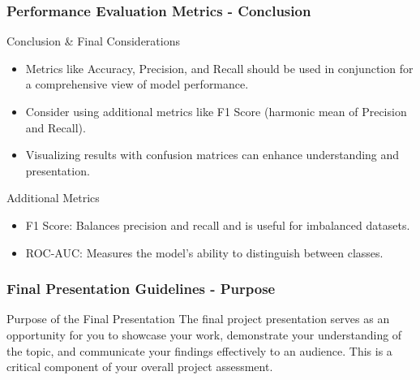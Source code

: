 \documentclass[aspectratio=169]{beamer}
\begin{document}
\begin{frame}[fragile]
    \frametitle{Performance Evaluation Metrics - Conclusion}
    \begin{block}{Conclusion & Final Considerations}
        \begin{itemize}
            \item Metrics like Accuracy, Precision, and Recall should be used in conjunction for a comprehensive view of model performance.
            \item Consider using additional metrics like F1 Score (harmonic mean of Precision and Recall).
            \item Visualizing results with confusion matrices can enhance understanding and presentation.
        \end{itemize}
    \end{block}  

    \begin{block}{Additional Metrics}
        \begin{itemize}
            \item F1 Score: Balances precision and recall and is useful for imbalanced datasets.
            \item ROC-AUC: Measures the model's ability to distinguish between classes.
        \end{itemize}
    \end{block}  
\end{frame}

\begin{frame}[fragile]
    \frametitle{Final Presentation Guidelines - Purpose}
    \begin{block}{Purpose of the Final Presentation}
        The final project presentation serves as an opportunity for you to showcase your work, demonstrate your understanding of the topic, and communicate your findings effectively to an audience. 
        This is a critical component of your overall project assessment.
    \end{block}
\end{frame}
\end{document}
